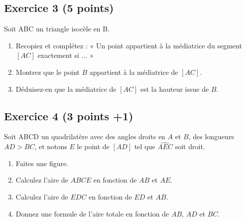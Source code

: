 \documentclass[14pt]{extreport}
\theoremstyle{plain}
\begin{document}
\subsection*{Exercice 3 (5 points)}

Soit ABC un triangle isocèle en B. 
\begin{enumerate}
\item Recopiez et complétez : « Un point appartient à la médiatrice du segment $[AC]$ exactement si ... »
\item  Montrez que le point $B$ appartient à la médiatrice de $[AC]$. 
\item Déduisez-en que la médiatrice de $[AC]$ est la hauteur issue de $B$. 
\end{enumerate}



\subsection*{Exercice 4 (3 points +1)}

Soit ABCD un quadrilatère avec des angles droits en $A$ et $B$, des longueurs $AD> BC$, et notons $E$ le point de $[AD]$ tel que $\widehat{AEC}$ soit droit. 
\begin{enumerate}
\item  Faites une figure.
\item Calculez l'aire de $ABCE$ en fonction de $AB$ et $AE$.
\item Calculez l'aire de $EDC$ en fonction de $ED$ et $AB$. 
\item Donnez une formule de l'aire totale en fonction de $AB$, $AD$ et $BC$.
\end{enumerate}
\end{document}
